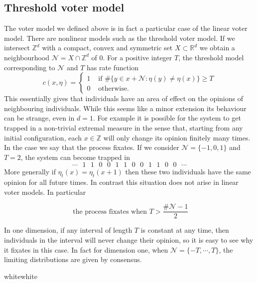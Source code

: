 \documentclass[12pt,a2paper,landscape]{article}
\newcommand\cBOX[4]{\begin{center}\fcolorbox{#4}{#3}{%
 \begin{minipage}{#1\columnwidth}#2\end{minipage}}\end{center}\vfill}
\begin{document}
\begin{multicols*}{3}
{{\subsection*{Threshold voter model}
The voter model we defined above is in fact a particular case of the linear voter model.
There are nonlinear models such as the threshold voter model. If we intersect $\mathbb{Z}^{d}$
with a compact, convex and symmetric set $X \subset \mathbb{R}^{d}$ we obtain a neighbourhood
$\mathcal{N}=X \cap \mathbb{Z}^{d}$ of $0$. For a positive integer $T$, the threshold model
corresponding to $\mathcal{N}$ and $T$ has rate function
\begin{equation*}
c(x, \eta)=
\begin{cases}
1 & \mbox{ if } \#\{y \in x + \mathcal{N}: \eta(y) \neq \eta(x)\}\geq T\\
0 & \mbox{ otherwise.}
\end{cases}
\end{equation*}
This essentially gives that individuals have an area of effect on the opinions of neighbouring individuals.
While this seems like a minor extension its behaviour can be strange, even in $d=1$. 
For example it is possible for the system to get trapped in a non-trivial extremal measure in the sense that, 
starting from any initial configuration, each $x \in \mathbb{Z}$ will only change its opinion finitely many times.
In the case we say that the process fixates.
If we consider $\mathcal{N}=\{-1,0,1\}$ and $T=2$, the system can become trapped in
$$ \cdots \phantom{Z} 1 \phantom{Z} 1 \phantom{Z} 0 \phantom{Z} 0 \phantom{Z} 1 \phantom{Z} 1
\phantom{Z} 0\phantom{Z} 0\phantom{Z} 1\phantom{Z} 1\phantom{Z} 0\phantom{Z} 0  \phantom{Z} \cdots $$
More generally if $\eta_{t}(x) = \eta_{t}(x+1)$ then these two individuals have the same opinion for all 
future times. In contrast this situation does not arise in linear voter models. In particular

$$ \mbox{ the process fixates when }T > \frac{\#\mathcal{N}-1}{2}$$

In one dimension, if any interval of length $T$ is constant at any time, then individuals
in the interval will never change their opinion, so it is easy to see why it fixates in this case.
In fact for dimension one, when $\mathcal{N}=\{-T,\cdots,T\}$, the limiting distributions are given 
by consensus.
}{white}{white}


\vspace{-2cm}
}
\end{multicols*}
\end{document}
